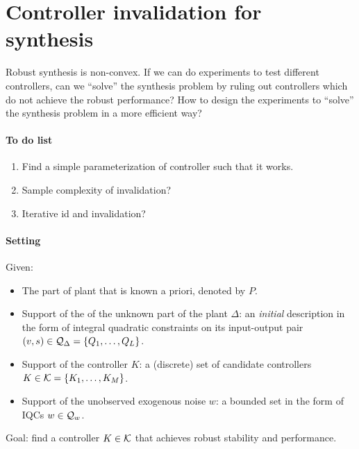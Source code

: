 \documentclass[11pt, onecolumn]{article}
\begin{document}


\newpage



\section{Controller invalidation for synthesis}
Robust synthesis is non-convex.  If we can do experiments to test different controllers, can we
``solve'' the synthesis problem by ruling out controllers which do not achieve the robust
performance? How to design the experiments to ``solve'' the synthesis problem in a more efficient
way?


\paragraph{To do list }
\begin{enumerate}
\item Find a simple parameterization of controller such that it works.
\item Sample complexity of invalidation?
\item Iterative id and invalidation?
\end{enumerate}



\paragraph{Setting}
Given:
\begin{itemize}
\item The part of plant that is known a priori, denoted by $P$.
\item Support of the of the unknown part of the plant $\Delta$: an {\em initial} description in the
  form of integral quadratic constraints on its input-output pair $(v,s)\in \mathcal Q_\Delta =
  \{Q_1,\dots, Q_L\}$.
\item Support of the controller $K$: a (discrete) set of candidate controllers $K \in \mathcal K =
  \{K_1,\dots, K_M\}$.
\item Support of the unobserved exogenous noise $w$: a bounded set in the form of IQCs $w\in \mathcal
  Q_{w}$.
\end{itemize}
Goal: find a controller $K\in\mathcal K$ that achieves robust stability and performance.
\end{document}
